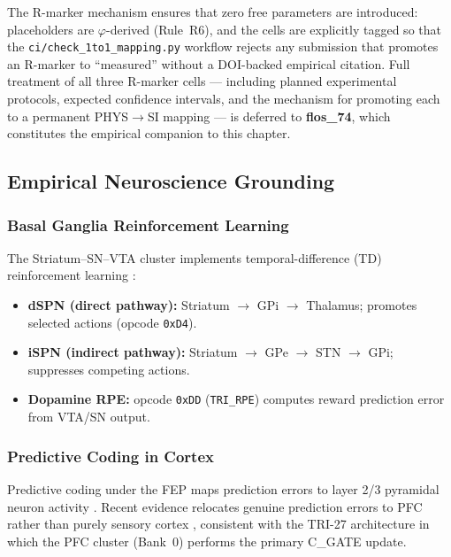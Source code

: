 The R-marker mechanism ensures that zero free parameters are introduced:
placeholders are $\varphi$-derived (Rule~R6), and the cells are explicitly
tagged so that the \texttt{ci/check\_1to1\_mapping.py} workflow rejects any
submission that promotes an R-marker to ``measured'' without a DOI-backed
empirical citation.  Full treatment of all three R-marker cells — including
planned experimental protocols, expected confidence intervals, and the
mechanism for promoting each to a permanent PHYS$\to$SI mapping — is
deferred to \textbf{flos\_74}, which constitutes the empirical companion to
this chapter.


\subsection{Empirical Neuroscience Grounding}
\label{ssec:flos73-empirical}

\subsubsection{Basal Ganglia Reinforcement Learning}

The Striatum–SN–VTA cluster implements temporal-difference (TD)
reinforcement learning \cite{schultz_2016,lindsey_2025,calabro_2022}:
\begin{itemize}
  \item \textbf{dSPN (direct pathway):} Striatum $\to$ GPi $\to$ Thalamus;
    promotes selected actions (opcode \texttt{0xD4}).
  \item \textbf{iSPN (indirect pathway):} Striatum $\to$ GPe $\to$ STN $\to$
    GPi; suppresses competing actions.
  \item \textbf{Dopamine RPE:} opcode \texttt{0xDD} (\texttt{TRI\_RPE})
    computes reward prediction error from VTA/SN output.
\end{itemize}

\subsubsection{Predictive Coding in Cortex}

Predictive coding under the FEP maps prediction errors to layer 2/3 pyramidal
neuron activity \cite{friston_kiebel_2009}.  Recent evidence relocates genuine
prediction errors to PFC rather than purely sensory cortex
\cite{gabhart_2025}, consistent with the TRI-27 architecture in which the PFC
cluster (Bank~0) performs the primary C\_GATE update.

